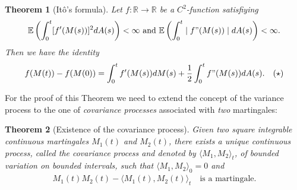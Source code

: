 \documentclass[11pt,a4paper, final]{article}
\newtheorem{thm}{Theorem}[section]
\begin{document}
\begin{thm}[Itô's formula] \label{itosformula}
Let $f: \mathbb{R} \to \mathbb{R}$ be a $C^2$-function satisfiying
\begin{align*}
\mathbb{E}\left( \int_0^t [f'(M(s))]^2 dA(s) \right) < \infty \text{ and } 
\mathbb{E}\left( \int_0^t \mid f"(M(s))\mid dA(s) \right) < \infty.
\end{align*}
Then we have the identity
\begin{align*}
f(M(t))-f(M(0))= \int_0^t f'(M(s)) dM(s) + \frac{1}{2} \int_0^t f"(M(s)) dA(s). \quad (\star)
\end{align*}
\end{thm}
\noindent For the proof of this Theorem we need to extend the concept of the variance process to the one of \textit{covariance processes} associated with \textit{two} martingales:
\begin{thm}[Existence of the covariance process]
Given two square integrable continuous martingales $M_1(t)$ and $M_2(t)$, there exists a unique continuous process, called the covariance process and denoted by
$\langle M_1,M_2\rangle_t$, of bounded variation on bounded intervals, such that $\langle M_1,M_2\rangle_0=0$ and 
\begin{align*}M_1(t) M_2(t)-\langle M_1(t),M_2(t) \rangle_t \quad \text{is a martingale.}
\end{align*}
\end{thm}
\end{document}
